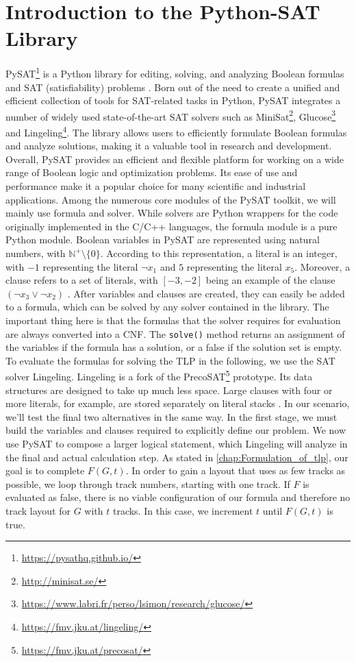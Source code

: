 \documentclass[bachelor, english]{algothesis}
\begin{document}
\section{Introduction to the Python-SAT Library}
PySAT\footnote{\url{https://pysathq.github.io/}} is a Python library for editing, solving, and analyzing Boolean formulas and SAT (satisfiability) problems \cite{PySAT}. Born out of the need to create a unified and efficient collection of tools for SAT-related tasks in Python, PySAT integrates a number of widely used state-of-the-art SAT solvers such as MiniSat\footnote{\url{http://minisat.se/}}, Glucose\footnote{\url{https://www.labri.fr/perso/lsimon/research/glucose/}} and Lingeling\footnote{\url{https://fmv.jku.at/lingeling/}}. The library allows users to efficiently formulate Boolean formulas and analyze solutions, making it a valuable tool in research and development. Overall, PySAT provides an efficient and flexible platform for working on a wide range of Boolean logic and optimization problems. Its ease of use and performance make it a popular choice for many scientific and industrial applications. \newline
Among the numerous core modules of the PySAT toolkit, we will mainly use formula and solver. While solvers are Python wrappers for the code originally implemented in the C/C++ languages, the formula module is a pure Python module. Boolean variables in PySAT are represented using natural numbers, with $\mathbb{N}^+\setminus\{0\}$. According to this representation, a literal is an integer, with $-1$ representing the literal $\lnot x_1$ and $5$ representing the literal $x_5$. Moreover, a clause refers to a set of literals, with $[-3, -2]$ being an example of the clause $(\lnot x_3 \lor \lnot x_2)$ \cite{PySAT}. After variables and clauses are created, they can easily be added to a formula, which can be solved by any solver contained in the library. The important thing here is that the formulas that the solver requires for evaluation are always converted into a CNF. The \texttt{solve()} method returns an assignment of the variables if the formula has a solution, or a false if the solution set is empty. \newline
To evaluate the formulas for solving the TLP in the following, we use the SAT solver Lingeling. Lingeling is a fork of the PrecoSAT\footnote{\url{https://fmv.jku.at/precosat/}} prototype. Its data structures are designed to take up much less space. Large clauses with four or more literals, for example, are stored separately on literal stacks \cite{LingeLing}. In our scenario, we'll test the final two alternatives in the same way. In the first stage, we must build the variables and clauses required to explicitly define our problem. We now use PySAT to compose a larger logical statement, which Lingeling will analyze in the final and actual calculation step. As stated in \cref{chap:Formulation_of_tlp}, our goal is to complete $F(G,t)$. In order to gain a layout that uses as few tracks as possible, we loop through track numbers, starting with one track. If $F$ is evaluated as false, there is no viable configuration of our formula and therefore no track layout for $G$ with $t$ tracks. In this case, we increment $t$ until $F(G,t)$ is true. 
\end{document}
